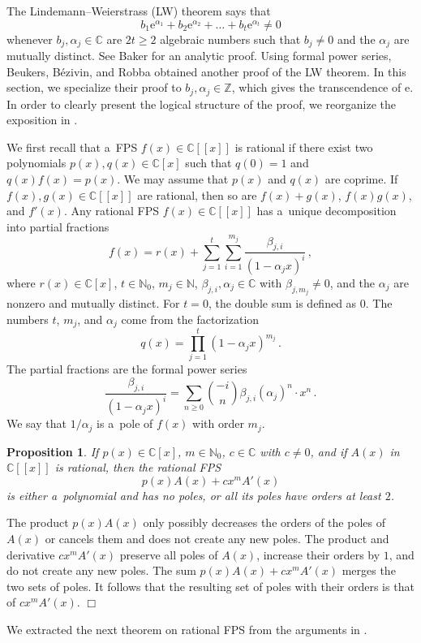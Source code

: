 \documentclass[10pt]{article}
\def\N{\mathbb{N}}
\def\Z{\mathbb{Z}}
\def\C{\mathbb{C}}
\def\proof{\par\noindent{\em Proof. }}
\def\eproof{\hfill{$\Box$}\bigskip}
\def\ds{\dots}
\def\al{\alpha}
\def\be{\beta}
\newtheorem{prop}[thm]{Proposition}
\begin{document}
The Lindemann--Weierstrass (LW) theorem says that
$$
b_1\mathrm{e}^{\al_1}+b_2
\mathrm{e}^{\al_2}+\ds+b_t\mathrm{e}^{\al_t}\ne0
$$
whenever $b_j,\al_j\in\C$ are $2t\ge2$ algebraic numbers such that 
$b_j\ne0$ and the $\al_j$ are mutually distinct. See 
Baker \cite[Theorem~1.4]{bake} for an analytic proof. Using 
formal power series, Beukers, B\'ezivin, and Robba \cite{beuk_al} obtained another proof of the LW theorem. In this section, we 
specialize their proof to $b_j,\al_j\in\Z$, which 
gives the transcendence of $\mathrm{e}$. In order to clearly 
present the logical structure of the proof, we reorganize 
the exposition in \cite{beuk_al}. 

We first recall that a~FPS $f(x)\in \C[[x]]$ is rational if there exist 
two polynomials $p(x),q(x)\in\C[x]$ such that $q(0)=1$ and $q(x)f(x)=p(x)$. We 
may assume that $p(x)$ and $q(x)$ are coprime. If $f(x),g(x)\in\C[[x]]$ are 
rational, then so are $f(x)+g(x)$, $f(x)g(x)$, and $f'(x)$. Any rational 
FPS $f(x)\in\C[[x]]$ has a~unique decomposition into partial fractions
$${\textstyle
f(x)=r(x)+\sum_{j=1}^t\sum_{i=1}^{m_j}
\frac{\be_{j,i}}{(1-\al_jx)^i}\,,
}
$$
where $r(x)\in\C[x]$, $t\in\N_0$, $m_j\in\N$, $\be_{j,i},\al_j\in\C$ with $\be_{j,m_j}\ne0$, and 
the $\al_j$ are nonzero and mutually distinct. For $t=0$, the double sum is defined as $0$. The numbers $t$, $m_j$, and $\al_j$ come from the factorization
$$
{\textstyle
q(x)=\prod_{j=1}^t(1-\al_jx)^{m_j}\,.
}
$$
The partial fractions are the formal power series
$${\textstyle
\frac{\be_{j,i}}{(1-\al_jx)^i}=
\sum_{n\ge0}\binom{-i}{n}\be_{j,i}(\al_j)^n\cdot x^n\,.
}
$$
We say that $1/\al_j$ is a~pole of $f(x)$ with order $m_j$. 

\begin{prop}\label{prop_oPolech}
If $p(x)\in\C[x]$, $m\in\N_0$, $c\in\C$ with $c\ne0$, and if $A(x)$ in $\C[[x]]$ is rational, then the
rational {\em FPS}
$$
p(x)A(x)+cx^mA'(x)
$$
is either a~polynomial and has no poles, or all its poles have orders 
at least $2$.
\end{prop}
\proof
The product 
$p(x)A(x)$ only possibly decreases the orders of the poles of $A(x)$ 
or cancels them and does not create any new poles.  The product and derivative  
$cx^mA'(x)$ preserve all poles of $A(x)$, increase their orders by 
$1$, and do not create any new poles. The sum $p(x)A(x)+cx^mA'(x)$ merges the 
two sets of poles. It follows that the resulting set of poles with their 
orders is that of $cx^mA'(x)$.
\eproof

We extracted the next theorem on rational FPS from the 
arguments in \cite{beuk_al}. 
\end{document}
